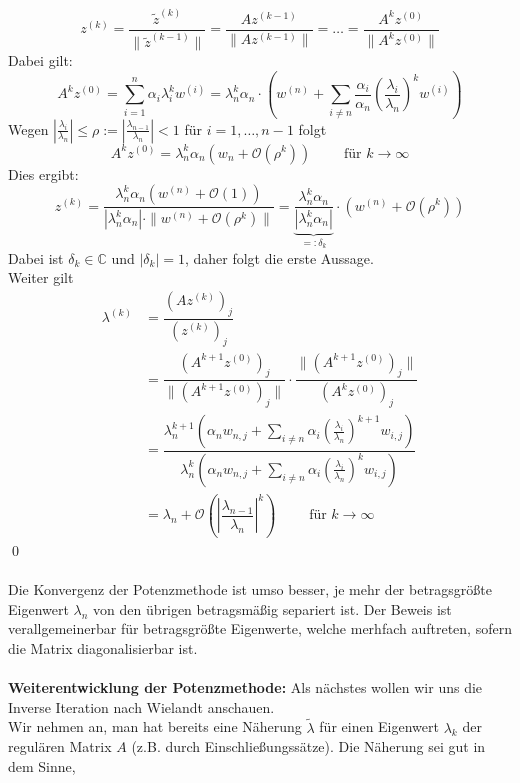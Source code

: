 \documentclass{article}
\begin{document}
    \[z^{(k)} = \dfrac{\tilde{z}^{(k)}}{\|\tilde{z}^{(k-1)}\|} = \dfrac{Az^{(k-1)}}{\|Az^{(k-1)}\|} 
    = \dotsc = \dfrac{A^kz^{(0)}}{\|A^kz^{(0)}\|}\]
    Dabei gilt:
    \[A^kz^{(0)} = \sum_{i=1}^{n}\alpha_i\lambda_i^kw^{(i)} = \lambda_n^k \alpha_n\cdot\left(w^{(n)} + 
    \sum_{i\neq n} \dfrac{\alpha_i}{\alpha_n}\left(\dfrac{\lambda_i}{\lambda_n}\right)^k w^{(i)}\right)\]
    Wegen $|\tfrac{\lambda_i}{\lambda_n}|\leq \rho:=|\tfrac{\lambda_{n-1}}{\lambda_n}|<1$ für $i=1,\dotsc,n-1$ folgt
    \[A^kz^{(0)} = \lambda_n^k\alpha_n(w_n+\mathcal{O}(\rho^k))
    \qquad \text{ für } k\rightarrow \infty\]
    Dies ergibt:
    \[z^{(k)} = \dfrac{\lambda_n^k\alpha_n(w^{(n)}+
    \mathcal{O}(1))}{|\lambda_n^k\alpha_n|\cdot\|w^{(n)}+\mathcal{O}(\rho^k)\|}
    = \underbrace{\dfrac{\lambda_n^k\alpha_n}{|\lambda_n^k\alpha_n|}}_{=:\delta_k}\cdot (w^{(n)}+\mathcal{O}(\rho^k))\]
    Dabei ist $\delta_k\in\mathbb{C}$ und $|\delta_k|=1$, daher folgt die erste Aussage.\\
    Weiter gilt 
    \begin{align*}
        \lambda^{(k)} &= \dfrac{(Az^{(k)})_j}{(z^{(k)})_j} \\
        &= \dfrac{(A^{k+1}z^{(0)})_j}{\|(A^{k+1}z^{(0)})_j\|}\cdot\dfrac{{\|(A^{k+1}z^{(0)})_j\|}}{(A^kz^{(0)})_j} \\
        &= \dfrac{\lambda_n^{k+1}(\alpha_n w_{n,j}+\sum_{i\neq n} \alpha_i(\tfrac{\lambda_i}{\lambda_n})^{k+1}w_{i,j})}
        {\lambda_n^k(\alpha_n w_{n,j}+\sum_{i\neq n} \alpha_i(\tfrac{\lambda_i}{\lambda_n})^kw_{i,j})} \\
        &= \lambda_n + \mathcal{O}\left(\left|\dfrac{\lambda_{n-1}}{\lambda_n}\right|^k\right)\qquad 
        \text{ für } k\rightarrow \infty
    \end{align*}
    \qed \\ \\
    Die Konvergenz der Potenzmethode ist umso besser, je mehr der betragsgrößte Eigenwert $\lambda_n$ von den übrigen 
    betragsmäßig separiert ist. Der Beweis ist verallgemeinerbar für betragsgrößte Eigenwerte, welche merhfach 
    auftreten, sofern die Matrix diagonalisierbar ist. \\ \\
    \textbf{Weiterentwicklung der Potenzmethode:} Als nächstes wollen wir uns die \glqq{}Inverse Iteration\grqq{} nach
    Wielandt anschauen. \\
    Wir nehmen an, man hat bereits eine Näherung $\tilde{\lambda}$ für einen Eigenwert $\lambda_k$ der regulären Matrix 
    $A$ (z.B. durch Einschließungssätze). Die Näherung sei gut in dem Sinne, 
\end{document}

